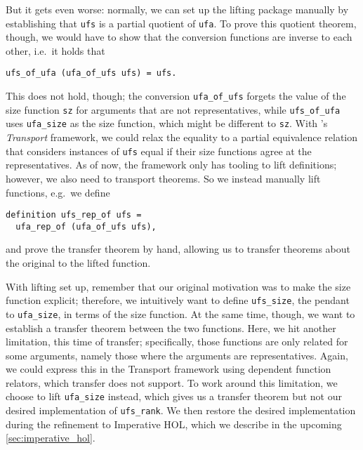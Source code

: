 \documentclass[
  sigplan,
  10pt,
  anonymous,
  review,
  ]{acmart}
\begin{document}
But it gets even worse:
normally, we can set up the lifting package manually by establishing that \lstinline|ufs| is a partial quotient of \lstinline|ufa|.
To prove this quotient theorem, though, we would have to show that the conversion functions are inverse to each other, i.e.\ it holds that
\begin{lstlisting}
ufs_of_ufa (ufa_of_ufs ufs) = ufs.
\end{lstlisting}
This does not hold, though;
the conversion \lstinline|ufa_of_ufs| forgets the value of the size function \lstinline|sz| for arguments that are not representatives, while \lstinline|ufs_of_ufa| uses \lstinline|ufa_size| as the size function, which might be different to \lstinline|sz|.
With \citeauthor{transport}'s \emph{Transport} framework, we could relax the equality to a partial equivalence relation that considers instances of \lstinline|ufs| equal if their size functions agree at the representatives. 
As of now, the framework only has tooling to lift definitions; however, we also need to transport theorems.
So we instead manually lift functions, e.g.\ we define
\begin{lstlisting}
definition ufs_rep_of ufs =
  ufa_rep_of (ufa_of_ufs ufs),
\end{lstlisting}
and prove the transfer theorem by hand, allowing us to transfer theorems about the original to the lifted function.

With lifting set up, remember that our original motivation was to make the size function explicit;
therefore, we intuitively want to define \lstinline|ufs_size|, the pendant to \lstinline|ufa_size|, in terms of the size function.
At the same time, though, we want to establish a transfer theorem between the two functions.
Here, we hit another limitation, this time of transfer;
specifically, those functions are only related for some arguments, namely those where the arguments are representatives.
Again, we could express this in the Transport framework using dependent function relators, which transfer does not support.
To work around this limitation, we choose to lift \lstinline|ufa_size| instead, which gives us a transfer theorem but not our desired implementation of \lstinline|ufs_rank|.
We then restore the desired implementation during the refinement to Imperative HOL, which we describe in the upcoming \autoref{sec:imperative_hol}.
\end{document}
